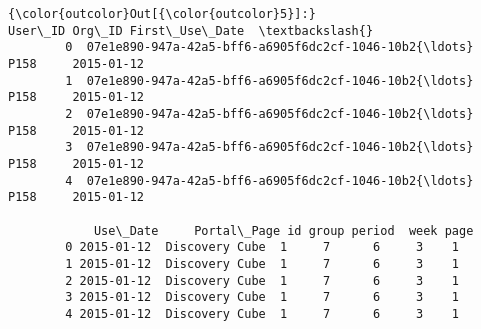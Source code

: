 \documentclass[11pt]{article}
\begin{document}
\begin{Verbatim}[commandchars=\\\{\}]
{\color{outcolor}Out[{\color{outcolor}5}]:}                                              User\_ID Org\_ID First\_Use\_Date  \textbackslash{}
        0  07e1e890-947a-42a5-bff6-a6905f6dc2cf-1046-10b2{\ldots}   P158     2015-01-12   
        1  07e1e890-947a-42a5-bff6-a6905f6dc2cf-1046-10b2{\ldots}   P158     2015-01-12   
        2  07e1e890-947a-42a5-bff6-a6905f6dc2cf-1046-10b2{\ldots}   P158     2015-01-12   
        3  07e1e890-947a-42a5-bff6-a6905f6dc2cf-1046-10b2{\ldots}   P158     2015-01-12   
        4  07e1e890-947a-42a5-bff6-a6905f6dc2cf-1046-10b2{\ldots}   P158     2015-01-12   
        
            Use\_Date     Portal\_Page id group period  week page  
        0 2015-01-12  Discovery Cube  1     7      6     3    1  
        1 2015-01-12  Discovery Cube  1     7      6     3    1  
        2 2015-01-12  Discovery Cube  1     7      6     3    1  
        3 2015-01-12  Discovery Cube  1     7      6     3    1  
        4 2015-01-12  Discovery Cube  1     7      6     3    1  
\end{Verbatim}
            
\end{document}
